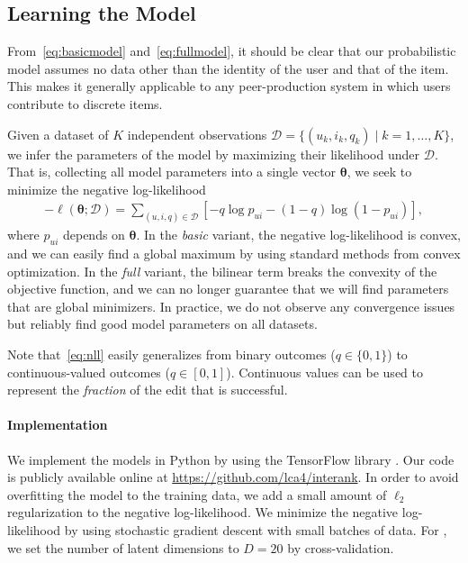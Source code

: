 \documentclass[format=sigconf]{acmart}
\newcommand{\interank}[1]{%
\ifthenelse{\isempty{#1}}{\textsc{interank}}{\textsc{interank} \emph{#1}}}
\begin{document}
\subsection{Learning the Model}
\label{sec:learning}

From~\eqref{eq:basicmodel} and~\eqref{eq:fullmodel}, it should be clear that our probabilistic model assumes no data other than the identity of the user and that of the item.
This makes it generally applicable to any peer-production system in which users contribute to discrete items.

Given a dataset of $K$ independent observations $\mathcal{D} = \{ (u_k, i_k, q_k) \mid k = 1, \ldots, K \}$, we infer the parameters of the model by maximizing their likelihood under $\mathcal{D}$.
That is, collecting all model parameters into a single vector $\bm{\theta}$, we seek to minimize the negative log-likelihood
\begin{align}
\label{eq:nll}
- \ell (\bm{\theta} ; \mathcal{D}) = \sum_{(u,i,q) \in \mathcal{D}} \left[ -q \log p_{ui} - (1 - q) \log (1 - p_{ui}) \right],
\end{align}
where $p_{ui}$ depends on $\bm{\theta}$.
In the \emph{basic} variant, the negative log-likelihood is convex, and we can easily find a global maximum by using standard methods from convex optimization.
In the \emph{full} variant, the bilinear term breaks the convexity of the objective function, and we can no longer guarantee that we will find parameters that are global minimizers.
In practice, we do not observe any convergence issues but reliably find good model parameters on all datasets.

Note that~\eqref{eq:nll} easily generalizes from binary outcomes ($q \in \{0, 1\}$) to continuous-valued outcomes ($q \in [0, 1]$).
Continuous values can be used to represent the \emph{fraction} of the edit that is successful.

\paragraph{Implementation}
We implement the models in Python by using the TensorFlow library \citep{abadi2016tensorflow}.
Our code is publicly available online at \url{https://github.com/lca4/interank}.
In order to avoid overfitting the model to the training data, we add a small amount of $\ell_2$ regularization to the negative log-likelihood.
We minimize the negative log-likelihood by using stochastic gradient descent \citep{bishop2006pattern} with small batches of data.
For \interank{full}, we set the number of latent dimensions to $D = 20$ by cross-validation.
\end{document}
